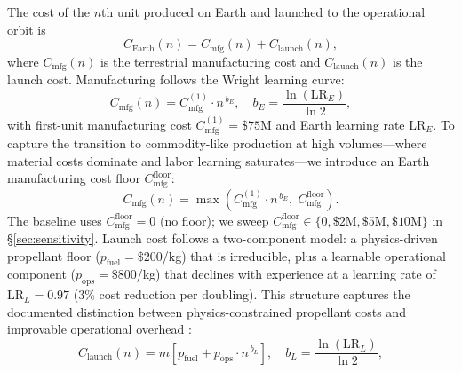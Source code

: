 \documentclass[preprint,12pt]{elsarticle}
\begin{document}
The cost of the $n$th unit produced on Earth and launched to the operational orbit is
\begin{equation}
  C_{\mathrm{Earth}}(n) = C_{\mathrm{mfg}}(n) + C_{\mathrm{launch}}(n),
  \label{eq:earth_unit}
\end{equation}
where $C_{\mathrm{mfg}}(n)$ is the terrestrial manufacturing cost and $C_{\mathrm{launch}}(n)$ is the launch cost. Manufacturing follows the Wright learning curve:
\begin{equation}
  C_{\mathrm{mfg}}(n) = C_{\mathrm{mfg}}^{(1)} \cdot n^{\,b_E}, \quad b_E = \frac{\ln(\mathrm{LR}_E)}{\ln 2},
  \label{eq:earth_mfg}
\end{equation}
with first-unit manufacturing cost $C_{\mathrm{mfg}}^{(1)} = \$75$M and Earth learning rate $\mathrm{LR}_E$. To capture the transition to commodity-like production at high volumes---where material costs dominate and labor learning saturates---we introduce an Earth manufacturing cost floor $C_{\mathrm{mfg}}^{\mathrm{floor}}$:
\begin{equation}
  C_{\mathrm{mfg}}(n) = \max\!\left(C_{\mathrm{mfg}}^{(1)} \cdot n^{\,b_E},\; C_{\mathrm{mfg}}^{\mathrm{floor}}\right).
  \label{eq:earth_mfg_floor}
\end{equation}
The baseline uses $C_{\mathrm{mfg}}^{\mathrm{floor}} = 0$ (no floor); we sweep $C_{\mathrm{mfg}}^{\mathrm{floor}} \in \{0, \$2\text{M}, \$5\text{M}, \$10\text{M}\}$ in \S\ref{sec:sensitivity}. Launch cost follows a two-component model: a physics-driven propellant floor ($p_{\mathrm{fuel}} = \$200$/kg) that is irreducible, plus a learnable operational component ($p_{\mathrm{ops}} = \$800$/kg) that declines with experience at a learning rate of $\mathrm{LR}_L = 0.97$ (3\% cost reduction per doubling). This structure captures the documented distinction between physics-constrained propellant costs and improvable operational overhead \cite{zapata2019}:
\begin{equation}
  C_{\mathrm{launch}}(n) = m \left[ p_{\mathrm{fuel}} + p_{\mathrm{ops}} \cdot n^{\,b_L} \right], \quad b_L = \frac{\ln(\mathrm{LR}_L)}{\ln 2},
  \label{eq:earth_launch}
\end{equation}
\end{document}
